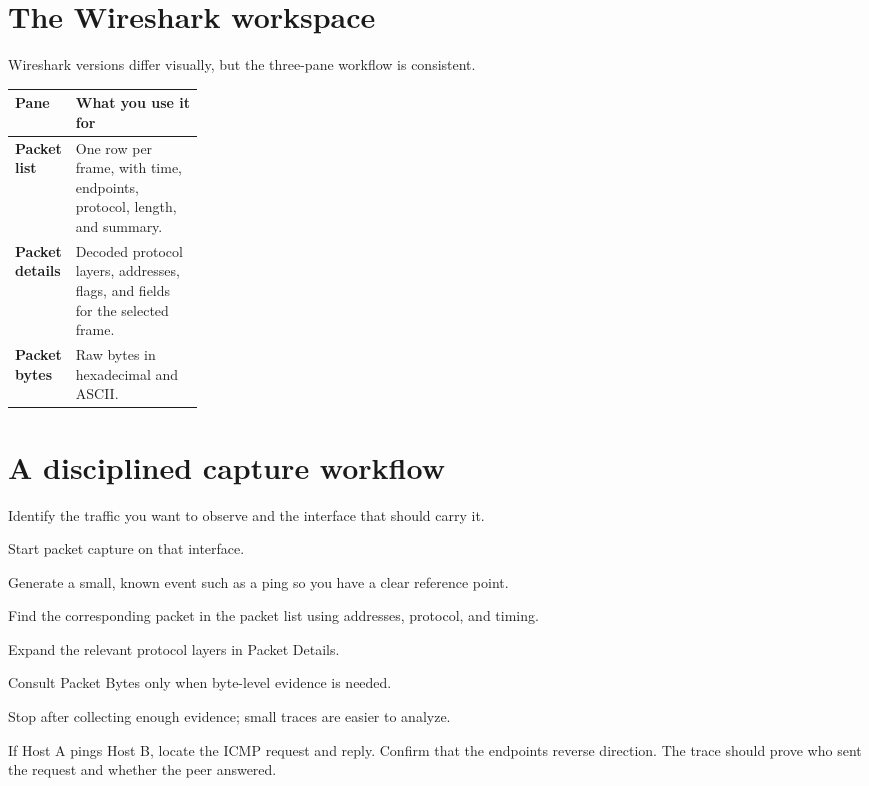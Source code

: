 \section{The Wireshark workspace}
Wireshark versions differ visually, but the three-pane workflow is consistent.


\begin{tabularx}{\linewidth}{>{\bfseries}p{0.22\linewidth}X}
\toprule
Pane & What you use it for\\\midrule
Packet list & One row per frame, with time, endpoints, protocol, length, and summary.\\
Packet details & Decoded protocol layers, addresses, flags, and fields for the selected frame.\\
Packet bytes & Raw bytes in hexadecimal and ASCII.\\\bottomrule
\end{tabularx}

\section{A disciplined capture workflow}
\begin{netsteps}
\item Identify the traffic you want to observe and the interface that should carry it.
\item Start packet capture on that interface.
\item Generate a small, known event such as a ping so you have a clear reference point.
\item Find the corresponding packet in the packet list using addresses, protocol, and timing.
\item Expand the relevant protocol layers in Packet Details.
\item Consult Packet Bytes only when byte-level evidence is needed.
\item Stop after collecting enough evidence; small traces are easier to analyze.
\end{netsteps}

\begin{workedexample}
If Host A pings Host B, locate the ICMP request and reply. Confirm that the endpoints reverse direction. The trace should prove who sent the request and whether the peer answered.
\end{workedexample}

